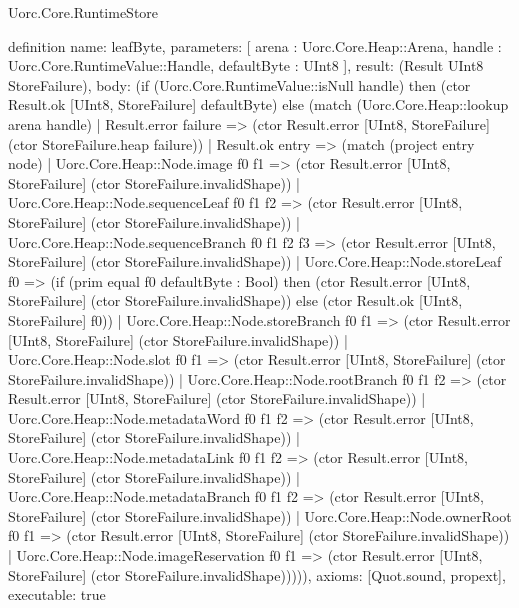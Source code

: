 \begin{lexlean}{Uorc.Core.RuntimeStore}
\begin{semanticmodule}
definition{
  name: leafByte,
  parameters: [
    arena : Uorc.Core.Heap::Arena,
    handle : Uorc.Core.RuntimeValue::Handle,
    defaultByte : UInt8
  ],
  result: (Result UInt8 StoreFailure),
  body: (if (Uorc.Core.RuntimeValue::isNull handle) then (ctor Result.ok [UInt8, StoreFailure] defaultByte) else (match (Uorc.Core.Heap::lookup arena handle)
    | Result.error failure => (ctor Result.error [UInt8, StoreFailure] (ctor StoreFailure.heap failure))
    | Result.ok entry => (match (project entry node)
      | Uorc.Core.Heap::Node.image f0 f1 => (ctor Result.error [UInt8, StoreFailure] (ctor StoreFailure.invalidShape))
      | Uorc.Core.Heap::Node.sequenceLeaf f0 f1 f2 => (ctor Result.error [UInt8, StoreFailure] (ctor StoreFailure.invalidShape))
      | Uorc.Core.Heap::Node.sequenceBranch f0 f1 f2 f3 => (ctor Result.error [UInt8, StoreFailure] (ctor StoreFailure.invalidShape))
      | Uorc.Core.Heap::Node.storeLeaf f0 => (if (prim equal f0 defaultByte : Bool) then (ctor Result.error [UInt8, StoreFailure] (ctor StoreFailure.invalidShape)) else (ctor Result.ok [UInt8, StoreFailure] f0))
      | Uorc.Core.Heap::Node.storeBranch f0 f1 => (ctor Result.error [UInt8, StoreFailure] (ctor StoreFailure.invalidShape))
      | Uorc.Core.Heap::Node.slot f0 f1 => (ctor Result.error [UInt8, StoreFailure] (ctor StoreFailure.invalidShape))
      | Uorc.Core.Heap::Node.rootBranch f0 f1 f2 => (ctor Result.error [UInt8, StoreFailure] (ctor StoreFailure.invalidShape))
      | Uorc.Core.Heap::Node.metadataWord f0 f1 f2 => (ctor Result.error [UInt8, StoreFailure] (ctor StoreFailure.invalidShape))
      | Uorc.Core.Heap::Node.metadataLink f0 f1 f2 => (ctor Result.error [UInt8, StoreFailure] (ctor StoreFailure.invalidShape))
      | Uorc.Core.Heap::Node.metadataBranch f0 f1 f2 => (ctor Result.error [UInt8, StoreFailure] (ctor StoreFailure.invalidShape))
      | Uorc.Core.Heap::Node.ownerRoot f0 f1 => (ctor Result.error [UInt8, StoreFailure] (ctor StoreFailure.invalidShape))
      | Uorc.Core.Heap::Node.imageReservation f0 f1 => (ctor Result.error [UInt8, StoreFailure] (ctor StoreFailure.invalidShape))))),
  axioms: [Quot.sound, propext],
  executable: true
}


\end{semanticmodule}
\end{lexlean}
